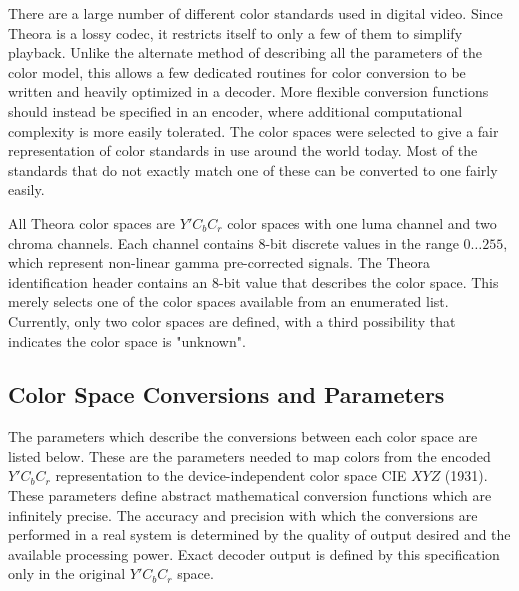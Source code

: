 \documentclass[11pt,letterpaper]{article}
\begin{document}
There are a large number of different color standards used in digital video.
Since Theora is a lossy codec, it restricts itself to only a few of them to
 simplify playback.
Unlike the alternate method of describing all the parameters of the color
 model, this allows a few dedicated routines for color conversion to be written
 and heavily optimized in a decoder.
More flexible conversion functions should instead be specified in an encoder,
 where additional computational complexity is more easily tolerated.
The color spaces were selected to give a fair representation of color standards
 in use around the world today.
Most of the standards that do not exactly match one of these can be converted
 to one fairly easily.

All Theora color spaces are $Y'C_bC_r$ color spaces with one luma channel and
 two chroma channels.
Each channel contains 8-bit discrete values in the range $0\ldots255$, which
 represent non-linear gamma pre-corrected signals.
The Theora identification header contains an 8-bit value that describes the
 color space.
This merely selects one of the color spaces available from an enumerated list.
Currently, only two color spaces are defined, with a third possibility that
 indicates the color space is "unknown".

\subsection{Color Space Conversions and Parameters}
\label{sec:color-xforms}

The parameters which describe the conversions between each color space are
 listed below.
These are the parameters needed to map colors from the encoded $Y'C_bC_r$
 representation to the device-independent color space CIE $XYZ$ (1931).
These parameters define abstract mathematical conversion functions which are
 infinitely precise.
The accuracy and precision with which the conversions are performed in a real
 system is determined by the quality of output desired and the available
 processing power.
Exact decoder output is defined by this specification only in the original
 $Y'C_bC_r$ space.
\end{document}

